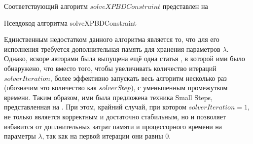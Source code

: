 	Соответствующий алгоритм $solveXPBDConstraint$ представлен на 

	\begin{algorithm} %
		\nonl{}
		\caption{Псевдокод алгоритма solveXPBDConstraint}
		\label{alg:SolveXPBDConstraint}
	\end{algorithm}
	\FloatBarrier
	
	Единственным недостатком данного алгоритма является то, что для его исполнения требуется дополнительная память для хранения параметров $\lambda$. Однако, вскоре авторами была выпущена ещё одна статья \cite{macklin2019small}, в которой ими было обнаружено, что вместо того, чтобы увеличивать количество итераций $solverIteration$, более эффективно запускать весь алгоритм несколько раз (обозначим это количество как $solverStep$), с уменьшенным промежутком времени. Таким образом, ими была предложена техника Small Steps, представленная на . При этом, крайний случай, при котором $solverIteration = 1$, не только является корректным и достаточно стабильным, но и позволяет избавится от доплнительных затрат памяти и процессорного времени на параметры $\lambda$, так как на первой итерации они равны 0.
	
